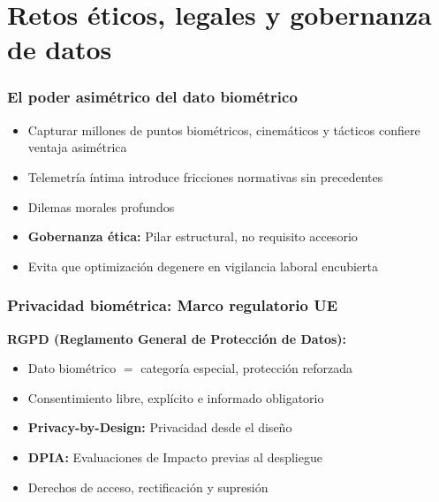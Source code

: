 \documentclass[aspectratio=169]{beamer}
\begin{document}
\section{Retos éticos, legales y gobernanza de datos}
\frame{\sectionpage}

\begin{frame}\frametitle{El poder asimétrico del dato biométrico}
\begin{itemize}
    \item Capturar millones de puntos biométricos, cinemáticos y tácticos confiere ventaja asimétrica
    \item Telemetría íntima introduce fricciones normativas sin precedentes
    \item Dilemas morales profundos
    \item \textbf{Gobernanza ética:} Pilar estructural, no requisito accesorio
    \item Evita que optimización degenere en vigilancia laboral encubierta
\end{itemize}
\end{frame}

\begin{frame}\frametitle{Privacidad biométrica: Marco regulatorio UE}
\textbf{RGPD (Reglamento General de Protección de Datos):}
\begin{itemize}
    \item Dato biométrico $=$ categoría especial, protección reforzada
    \item Consentimiento libre, explícito e informado obligatorio
    \item \textbf{Privacy-by-Design:} Privacidad desde el diseño
    \item \textbf{DPIA:} Evaluaciones de Impacto previas al despliegue
    \item Derechos de acceso, rectificación y supresión
\end{itemize}
\end{frame}
\end{document}
